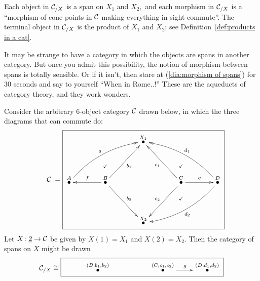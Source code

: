\documentclass[../main/CT4S-EN-RU]{subfiles}
\begin{document}
\begin{constructionENG}[Products]
Each object in $\mathcal{C}_{/X}$ is a span on $X_1$ and $X_2,$ and each morphism in $\mathcal{C}_{/X}$ is a “morphism of cone points in $\mathcal{C}$ making everything in sight commute”. The terminal object in $\mathcal{C}_{/X}$ is the product of $X_1$ and $X_2$; see Definition~\ref{def:products in a cat}.
\end{constructionENG}

\begin{constructionRUS}[Products]
\end{constructionRUS}

\begin{blockENG}
It may be strange to have a category in which the objects are spans in another category. But once you admit this possibility, the notion of morphism between spans is totally sensible. Or if it isn't, then stare at (\ref{dia:morphism of spans}) for 30 seconds and say to yourself “When in Rome..!” These are the aqueducts of category theory, and they work wonders.
\end{blockENG}

\begin{blockRUS}
\end{blockRUS}

\begin{exampleENG}\label{ex:category of spans}
Consider the arbitrary 6-object category $\mathcal{C}$ drawn below, in which the three diagrams that can commute do:
$$\mcC:=\parbox{3in}{\fbox{\xymatrix@=39pt{&&\LMO{X_1}&\\\LMO{A}\ar@/^1pc/[urr]^a&\LMO{B}\ar[l]_f\ar@{}[u]|(.4){\checkmark}\ar[ur]_{b_1}\ar[dr]^{b_2}&&\LMO{C}\ar@{}[u]|(.4){\checkmark}\ar@{}[d]|(.4){\checkmark}\ar[ul]^{c_1}\ar[dl]_{c_2}\ar[r]^g&\LMO{D}\ar@/_1pc/[llu]_{d_1}\ar@/^1pc/[lld]^{d_2}\\&&\LMO{X_2}&}}}$$
Let $X\colon\underline{2}\rightarrow\mathcal{C}$ be given by $X(1)=X_1$ and $X(2)=X_2.$ Then the category of spans on $X$ might be drawn
$$\mcC_{/X}\iso\fbox{\xymatrix{&\LMO{(B,b_1,b_2)}&&\LMO{(C,c_1,c_2)}\ar[r]^g&\LMO{(D,d_1,d_2)}}}$$
\end{exampleENG}

\begin{exampleRUS}\label{ex:category of spans}
\end{exampleRUS}


\subsubsection{}
\end{document}

